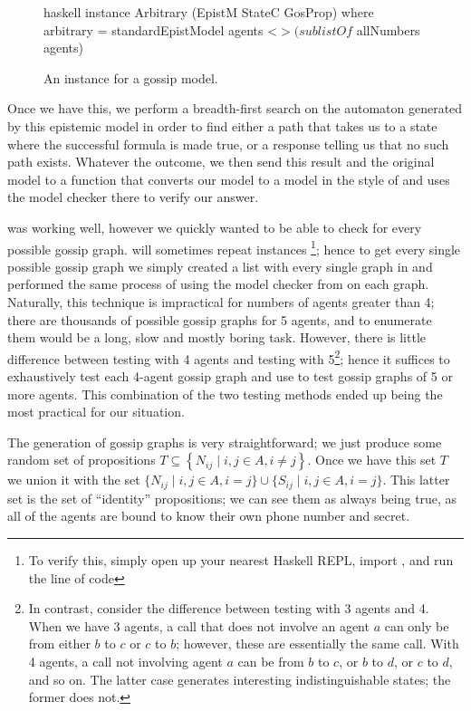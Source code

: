 \documentclass[10pt, a4paper]{report}
\begin{document}
\begin{figure}[h]
  \centering
  \begin{cminted}{haskell}
      instance Arbitrary (EpistM StateC GosProp) where
        arbitrary = standardEpistModel agents <$> (sublistOf $ allNumbers agents)
  \end{cminted}
  \caption{An  instance for a gossip model.}
  \label{fig:Arbitrary}
\end{figure}

Once we have this, we perform a breadth-first search on the automaton generated
by this epistemic model in order to find either a path that takes us to a state
where the successful formula is made true, or a response telling us that no such
path exists. Whatever the outcome, we then send this result and the original
model to a function that converts our model to a model in the style of
\cite{GithubGossip} and uses the model checker there to verify our answer.

 was working well, however we quickly wanted to be able to check
for every possible gossip graph.  will sometimes repeat
instances \footnote{To verify this, simply open up your nearest Haskell REPL,
  import , and run the line of code }; hence to get every single
possible gossip graph we simply created a list with every single graph in and
performed the same process of using the model checker from \cite{GithubGossip}
on each graph. Naturally, this technique is impractical for numbers of agents
greater than 4; there are thousands of possible gossip graphs for 5 agents, and
to enumerate them would be a long, slow and mostly boring task. However, there
is little difference between testing with 4 agents and testing with
5\footnote{In contrast, consider the difference between testing with 3 agents
  and 4. When we have 3 agents, a call that does not involve an agent $a$ can
  only be from either $b$ to $c$ or $c$ to $b$; however, these are essentially
  the same call. With 4 agents, a call not involving agent $a$ can be from $b$
  to $c$, or $b$ to $d$, or $c$ to $d$, and so on. The latter case generates
  interesting indistinguishable states; the former does not.}; hence it suffices
to exhaustively test each 4-agent gossip graph and use  to test
gossip graphs of 5 or more agents. This combination of the two testing methods
ended up being the most practical for our situation.

The generation of gossip graphs is very straightforward; we just produce some
random set of propositions $T \subseteq \left\{ N_{ij} \mid i, j \in A, i \not =
  j \right\}$. Once we have this set $T$ we union it with the set 
$\{N_{ij} \mid i, j \in A, i = j\} \cup \{S_{ij} \mid i, j \in A,
i = j\}$. This latter set is the set of ``identity'' propositions; we can see
them as always being true, as all of the agents are bound to know their own
phone number and secret.
\end{document}
